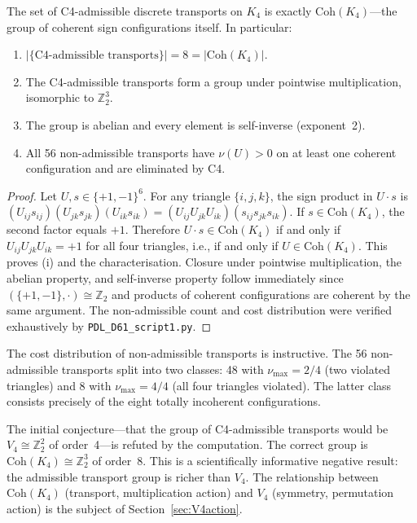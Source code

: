 \documentclass[11pt,a4paper]{article}
\newenvironment{theorembox}[1][]{%
  \begin{tcolorbox}[theoremstyle,title={Theorem%
    \ifx\relax#1\relax\else: #1\fi}]}{\end{tcolorbox}}
\newenvironment{negativebox}[1][]{%
  \begin{tcolorbox}[negativestyle,title={Negative Result%
    \ifx\relax#1\relax\else: #1\fi}]}{\end{tcolorbox}}
\theoremstyle{plain}
\theoremstyle{definition}
\theoremstyle{remark}
\newcommand{\Kfour}{K_4}
\newcommand{\Vfour}{V_4}
\newcommand{\Coh}{\mathrm{Coh}(K_4)}
\begin{document}
\begin{theorembox}[Admissible transports $= \Coh$]
\label{thm:admissible}
The set of C4-admissible discrete transports on $\Kfour$ is exactly
$\Coh$---the group of coherent sign configurations itself. In particular:
\begin{enumerate}[label=(\roman*)]
\item $|\{\text{C4-admissible transports}\}| = 8 = |\Coh|$.
\item The C4-admissible transports form a group under pointwise multiplication,
isomorphic to $\mathbb{Z}_2^3$.
\item The group is abelian and every element is self-inverse (exponent~2).
\item All 56 non-admissible transports have $\nu(U) > 0$ on at least one
coherent configuration and are eliminated by C4.
\end{enumerate}
\end{theorembox}

\begin{proof}
Let $U, s \in \{+1,-1\}^6$. For any triangle $\{i,j,k\}$, the sign product in
$U \cdot s$ is $(U_{ij} s_{ij})(U_{jk} s_{jk})(U_{ik} s_{ik}) = (U_{ij} U_{jk} U_{ik})(s_{ij} s_{jk} s_{ik})$.
If $s \in \Coh$, the second factor equals $+1$. Therefore $U \cdot s \in \Coh$ if
and only if $U_{ij} U_{jk} U_{ik} = +1$ for all four triangles, i.e., if and only
if $U \in \Coh$. This proves (i) and the characterisation. Closure under
pointwise multiplication, the abelian property, and self-inverse property follow
immediately since $(\{+1,-1\}, \cdot) \cong \mathbb{Z}_2$ and products of coherent
configurations are coherent by the same argument. The non-admissible count and
cost distribution were verified exhaustively by \texttt{PDL\_D61\_script1.py}.
\end{proof}

The cost distribution of non-admissible transports is instructive. The 56
non-admissible transports split into two classes: 48 with $\nu_{\max} = 2/4$
(two violated triangles) and 8 with $\nu_{\max} = 4/4$ (all four triangles
violated). The latter class consists precisely of the eight totally incoherent
configurations.

\begin{negativebox}[Initial conjecture refuted: admissible group $\neq \Vfour$]
The initial conjecture---that the group of C4-admissible transports would be
$\Vfour \cong \mathbb{Z}_2^2$ of order~4---is refuted by the computation. The correct
group is $\Coh \cong \mathbb{Z}_2^3$ of order~8. This is a scientifically
informative negative result: the admissible transport group is richer than $\Vfour$.
The relationship between $\Coh$ (transport, multiplication action) and $\Vfour$
(symmetry, permutation action) is the subject of Section~\ref{sec:V4action}.
\end{negativebox}
\end{document}
